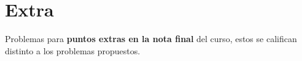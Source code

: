 \section{Extra}

Problemas para \textbf{puntos extras en la nota final} del curso, estos se califican distinto a los problemas propuestos.